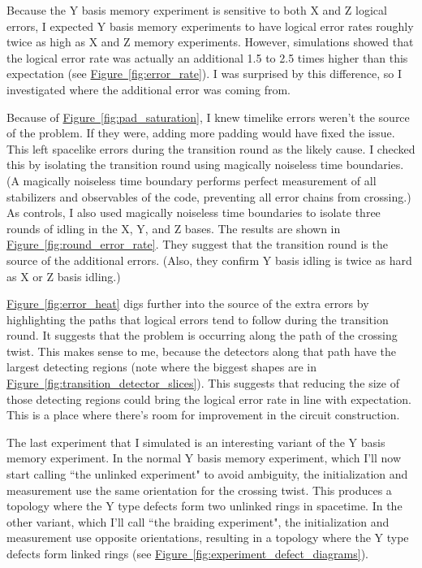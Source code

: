 \documentclass[onecolumn,unpublished,a4paper]{quantumarticle}
\theoremstyle{definition}
\theoremstyle{definition}
\theoremstyle{definition}
\newcommand{\fig}[1]{\hyperref[fig:#1]{Figure~\ref*{fig:#1}}}
\begin{document}
Because the Y basis memory experiment is sensitive to both X and Z logical errors, I expected Y basis memory experiments to have logical error rates roughly twice as high as X and Z memory experiments.
However, simulations showed that the logical error rate was actually an additional 1.5 to 2.5 times higher than this expectation (see \fig{error_rate}).
I was surprised by this difference, so I investigated where the additional error was coming from.

Because of \fig{pad_saturation}, I knew timelike errors weren't the source of the problem.
If they were, adding more padding would have fixed the issue.
This left spacelike errors during the transition round as the likely cause.
I checked this by isolating the transition round using magically noiseless time boundaries.
(A magically noiseless time boundary performs perfect measurement of all stabilizers and observables of the code, preventing all error chains from crossing.)
As controls, I also used magically noiseless time boundaries to isolate three rounds of idling in the X, Y, and Z bases.
The results are shown in \fig{round_error_rate}.
They suggest that the transition round is the source of the additional errors.
(Also, they confirm Y basis idling is twice as hard as X or Z basis idling.)

\fig{error_heat} digs further into the source of the extra errors by highlighting the paths that logical errors tend to follow during the transition round.
It suggests that the problem is occurring along the path of the crossing twist.
This makes sense to me, because the detectors along that path have the largest detecting regions (note where the biggest shapes are in \fig{transition_detector_slices}).
This suggests that reducing the size of those detecting regions could bring the logical error rate in line with expectation.
This is a place where there's room for improvement in the circuit construction.

The last experiment that I simulated is an interesting variant of the Y basis memory experiment.
In the normal Y basis memory experiment, which I'll now start calling ``the unlinked experiment" to avoid ambiguity, the initialization and measurement use the same orientation for the crossing twist.
This produces a topology where the Y type defects form two unlinked rings in spacetime.
In the other variant, which I'll call ``the braiding experiment", the initialization and measurement use opposite orientations, resulting in a topology where the Y type defects form linked rings (see \fig{experiment_defect_diagrams}).
\end{document}
